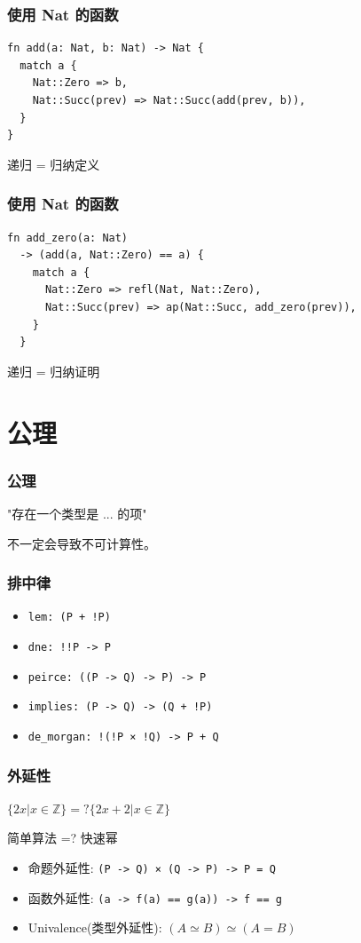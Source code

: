 \documentclass[UTF-8]{ctexbeamer}
\begin{document}
\begin{frame}[fragile]
  \frametitle{使用 Nat 的函数}

  \begin{verbatim}
fn add(a: Nat, b: Nat) -> Nat {
  match a {
    Nat::Zero => b,
    Nat::Succ(prev) => Nat::Succ(add(prev, b)),
  }
}
  \end{verbatim}

  \pause

  递归 = 归纳定义
\end{frame}

\begin{frame}[fragile]
  \frametitle{使用 Nat 的函数}
  \begin{verbatim}
fn add_zero(a: Nat)
  -> (add(a, Nat::Zero) == a) {
    match a {
      Nat::Zero => refl(Nat, Nat::Zero),
      Nat::Succ(prev) => ap(Nat::Succ, add_zero(prev)),
    }
  }
  \end{verbatim}
  \pause

  递归 = 归纳证明
\end{frame}

\section{公理}

\begin{frame}
  \frametitle{公理}

  "存在一个类型是 ... 的项"

  \pause

  不一定会导致不可计算性。
\end{frame}

\begin{frame}
  \frametitle{排中律}

  \begin{itemize}
    \item \texttt{lem: (P + !P)}
    \item \texttt{dne: !!P -> P}
    \item \texttt{peirce: ((P -> Q) -> P) -> P}
    \item \texttt{implies: (P -> Q) -> (Q + !P)}
    \item \texttt{de\_morgan: !(!P × !Q) -> P + Q}
  \end{itemize}
\end{frame}

\begin{frame}
  \frametitle{外延性}

  $\{2x | x \in \mathbb{Z}\} =? \{2x + 2 | x \in \mathbb{Z}\}$
  \pause

  简单算法 =? 快速幂

  \pause

  \begin{itemize}
    \item 命题外延性: \texttt{(P -> Q) × (Q -> P) -> P = Q}
    \pause
    \item 函数外延性: \texttt{(a -> f(a) == g(a)) -> f == g}
    \pause
    \item Univalence(类型外延性): $(A \simeq B) \simeq (A = B)$
  \end{itemize}
\end{frame}
\end{document}

